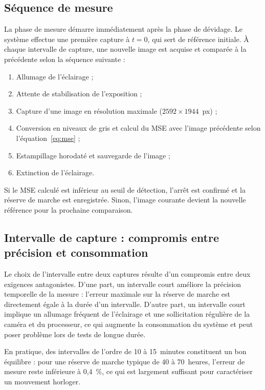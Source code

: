 \subsection{Séquence de mesure}

La phase de mesure démarre immédiatement après la phase de dévidage. Le
système effectue une première capture à $t = 0$, qui sert de référence
initiale. À chaque intervalle de capture, une nouvelle image est acquise et
comparée à la précédente selon la séquence suivante :

\begin{enumerate}
    \item Allumage de l'éclairage ;
    \item Attente de stabilisation de l'exposition ;
    \item Capture d'une image en résolution maximale ($2592 \times 1944$~px) ;
    \item Conversion en niveaux de gris et calcul du MSE avec l'image précédente selon l'équation~\eqref{eq:mse} ;
    \item Estampillage horodaté et sauvegarde de l'image ;
    \item Extinction de l'éclairage.
\end{enumerate}

Si le MSE calculé est inférieur au seuil de détection, l'arrêt est confirmé
et la réserve de marche est enregistrée. Sinon, l'image courante devient la
nouvelle référence pour la prochaine comparaison.

\subsection{Intervalle de capture : compromis entre précision et consommation}
\label{sec:intervalle_capture}

Le choix de l'intervalle entre deux captures résulte d'un compromis entre
deux exigences antagonistes. D'une part, un intervalle court améliore la
précision temporelle de la mesure : l'erreur maximale sur la réserve de
marche est directement égale à la durée d'un intervalle. D'autre part, un
intervalle court implique un allumage fréquent de l'éclairage et une
sollicitation régulière de la caméra et du processeur, ce qui augmente la
consommation du système et peut poser problème lors de tests de longue durée.

En pratique, des intervalles de l'ordre de 10 à 15~minutes constituent un
bon équilibre : pour une réserve de marche typique de 40 à 70~heures,
l'erreur de mesure reste inférieure à 0,4~\%, ce qui est largement suffisant
pour caractériser un mouvement horloger.

